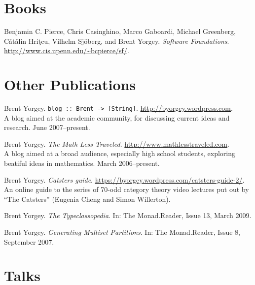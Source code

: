 \documentclass[12pt]{article}
\newcommand{\cvitem}{\par\hangpara{2em}{1}}
\begin{document}
\section*{Books}
\cvitem Benjamin C. Pierce, Chris Casinghino, Marco Gaboardi, Michael Greenberg,
C{\v a}t{\v a}lin Hri{\c t}cu, Vilhelm Sj\"oberg, and Brent Yorgey. \emph{Software
  Foundations}. \url{http://www.cis.upenn.edu/~bcpierce/sf/}.

\section*{Other Publications}
\cvitem Brent Yorgey. \texttt{blog :: Brent ->
  [String]}. \url{http://byorgey.wordpress.com}.  \\
A blog aimed at the academic community, for discussing current ideas
and research.  June 2007--present.

\cvitem Brent Yorgey. \emph{The Math Less
  Traveled}. \url{http://www.mathlesstraveled.com}. \\
A blog aimed at a broad audience, especially high school students,
exploring beatiful ideas in mathematics.  March 2006--present.

\cvitem Brent Yorgey. \emph{Catsters
  guide}. \url{https://byorgey.wordpress.com/catsters-guide-2/}. \\
An online guide to the series of 70-odd category theory video lectures
put out by ``The Catsters'' (Eugenia Cheng and Simon Willerton).

\cvitem Brent Yorgey. \emph{The Typeclassopedia}. In: The
Monad.Reader, Issue 13, March 2009.

\cvitem Brent Yorgey. \emph{Generating Multiset Partitions}.  In: The
Monad.Reader, Issue 8, September 2007.


\section*{Talks}
\end{document}
